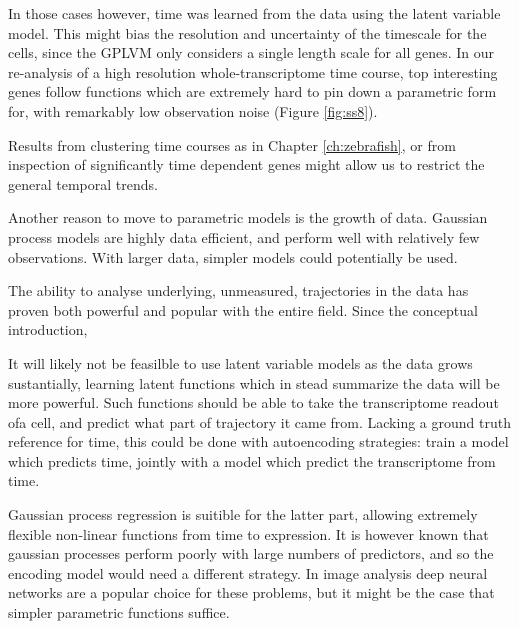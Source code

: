 In those cases however, time was learned from the data using the latent variable model. This might bias the resolution and uncertainty of the timescale for the cells, since the GPLVM only considers a single length scale for all genes. In our re-analysis of a high resolution whole-transcriptome time course, top interesting genes follow functions which are extremely hard to pin down a parametric form for, with remarkably low observation noise (Figure \ref{fig:ss8}).

Results from clustering time courses as in Chapter \ref{ch:zebrafish}, or from inspection of significantly time dependent genes might allow us to restrict the general temporal trends.

Another reason to move to parametric models is the growth of data. Gaussian process models are highly data efficient, and perform well with relatively few observations. With larger data, simpler models could potentially be used.

The ability to analyse underlying, unmeasured, trajectories in the data has proven both powerful and popular with the entire field. Since the conceptual introduction, 

It will likely not be feasilble to use latent variable models as the data grows sustantially, learning latent functions which in stead summarize the data will be more powerful. Such functions should be able to take the transcriptome readout ofa cell, and predict what part of trajectory it came from. Lacking a ground truth reference for time, this could be done with autoencoding strategies: train a model which predicts time, jointly with a model which predict the transcriptome from time.

Gaussian process regression is suitible for the latter part, allowing extremely flexible non-linear functions from time to expression. It is however known that gaussian processes perform poorly with large numbers of predictors, and so the encoding model would need a different strategy. In image analysis deep neural networks are a popular choice for these problems, but it might be the case that simpler parametric functions suffice.
